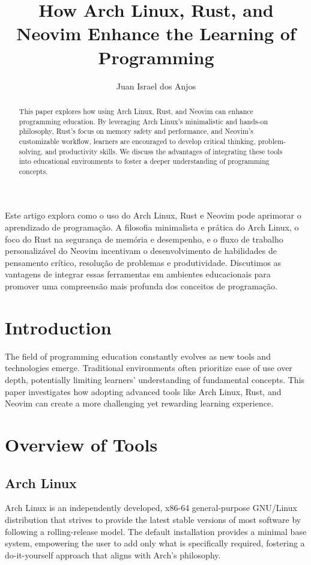 \documentclass[12pt]{article}
\title{How Arch Linux, Rust, and Neovim Enhance the Learning of Programming}
\author{Juan Israel dos Anjos\inst{1}}
\begin{document}
 

\maketitle

\begin{abstract}
  This paper explores how using Arch Linux, Rust, and Neovim can enhance programming education. By leveraging Arch Linux's minimalistic and hands-on philosophy, Rust's focus on memory safety and performance, and Neovim's customizable workflow, learners are encouraged to develop critical thinking, problem-solving, and productivity skills. We discuss the advantages of integrating these tools into educational environments to foster a deeper understanding of programming concepts.
\end{abstract}

\begin{resumo} 
Este artigo explora como o uso do Arch Linux, Rust e Neovim pode aprimorar o aprendizado de programação. A filosofia minimalista e prática do Arch Linux, o foco do Rust na segurança de memória e desempenho, e o fluxo de trabalho personalizável do Neovim incentivam o desenvolvimento de habilidades de pensamento crítico, resolução de problemas e produtividade. Discutimos as vantagens de integrar essas ferramentas em ambientes educacionais para promover uma compreensão mais profunda dos conceitos de programação.
\end{resumo}
     
\section{Introduction}

The field of programming education constantly evolves as new tools and technologies emerge. Traditional environments often prioritize ease of use over depth, potentially limiting learners' understanding of fundamental concepts. This paper investigates how adopting advanced tools like Arch Linux, Rust, and Neovim can create a more challenging yet rewarding learning experience.

\section{Overview of Tools}

\subsection{Arch Linux}
Arch Linux is an independently developed, x86-64 general-purpose GNU/Linux distribution that strives to provide the latest stable versions of most software by following a rolling-release model. The default installation provides a minimal base system, empowering the user to add only what is specifically required, fostering a do-it-yourself approach that aligns with Arch’s philosophy.
\end{document}
